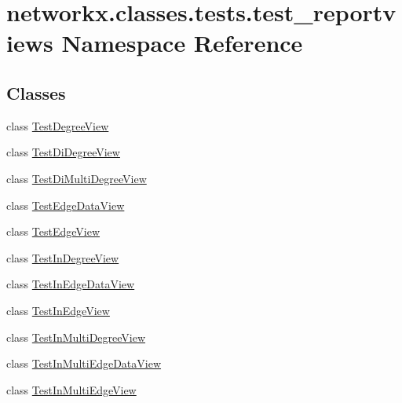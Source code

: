 \hypertarget{namespacenetworkx_1_1classes_1_1tests_1_1test__reportviews}{}\section{networkx.\+classes.\+tests.\+test\+\_\+reportviews Namespace Reference}
\label{namespacenetworkx_1_1classes_1_1tests_1_1test__reportviews}
\subsection*{Classes}
\begin{DoxyCompactItemize}
\item 
class \hyperlink{classnetworkx_1_1classes_1_1tests_1_1test__reportviews_1_1TestDegreeView}{Test\+Degree\+View}
\item 
class \hyperlink{classnetworkx_1_1classes_1_1tests_1_1test__reportviews_1_1TestDiDegreeView}{Test\+Di\+Degree\+View}
\item 
class \hyperlink{classnetworkx_1_1classes_1_1tests_1_1test__reportviews_1_1TestDiMultiDegreeView}{Test\+Di\+Multi\+Degree\+View}
\item 
class \hyperlink{classnetworkx_1_1classes_1_1tests_1_1test__reportviews_1_1TestEdgeDataView}{Test\+Edge\+Data\+View}
\item 
class \hyperlink{classnetworkx_1_1classes_1_1tests_1_1test__reportviews_1_1TestEdgeView}{Test\+Edge\+View}
\item 
class \hyperlink{classnetworkx_1_1classes_1_1tests_1_1test__reportviews_1_1TestInDegreeView}{Test\+In\+Degree\+View}
\item 
class \hyperlink{classnetworkx_1_1classes_1_1tests_1_1test__reportviews_1_1TestInEdgeDataView}{Test\+In\+Edge\+Data\+View}
\item 
class \hyperlink{classnetworkx_1_1classes_1_1tests_1_1test__reportviews_1_1TestInEdgeView}{Test\+In\+Edge\+View}
\item 
class \hyperlink{classnetworkx_1_1classes_1_1tests_1_1test__reportviews_1_1TestInMultiDegreeView}{Test\+In\+Multi\+Degree\+View}
\item 
class \hyperlink{classnetworkx_1_1classes_1_1tests_1_1test__reportviews_1_1TestInMultiEdgeDataView}{Test\+In\+Multi\+Edge\+Data\+View}
\item 
class \hyperlink{classnetworkx_1_1classes_1_1tests_1_1test__reportviews_1_1TestInMultiEdgeView}{Test\+In\+Multi\+Edge\+View}
\item 

\end{DoxyCompactItemize}
